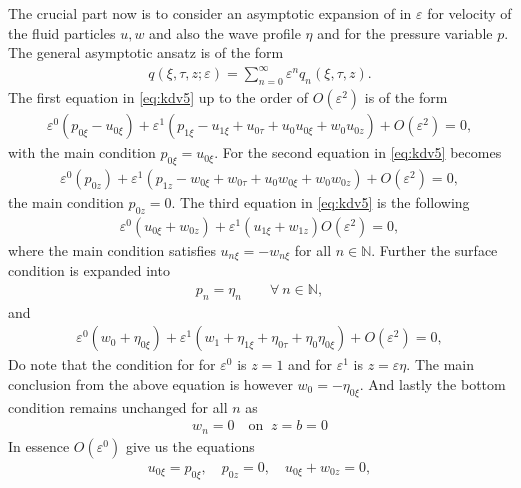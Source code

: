 The crucial part now is to consider an asymptotic expansion of in
$\varepsilon$ for velocity of the fluid particles $u, w$ and also the wave
profile $\eta$ and for the pressure variable $p$. The general asymptotic
ansatz is of the form
\begin{align}
    q\left( \xi, \tau, z; \varepsilon \right)  = \sum_{n=0}^{\infty}
    \varepsilon^n q_n\left( \xi, \tau, z \right).
\end{align}
The first equation in \ref{eq:kdv5} up to the order of $O(\varepsilon^2)$ is
of the form
\begin{align}
    \varepsilon^0\left( p_{0\xi} - u_{0\xi}\right) + \varepsilon^1\left(
    p_{1\xi} - u_{1\xi} + u_{0\tau} + u_0 u_{0\xi} + w_0u_{0z} \right)
    +O(\varepsilon^2) = 0,
\end{align}
with the main condition $p_{0\xi} = u_{0\xi}$. For the second equation in
\ref{eq:kdv5} becomes
\begin{align}
    \varepsilon^0\left( p_{0z} \right)
    +\varepsilon^1\left( p_{1z}-w_{0\xi} + w_{0\tau} + u_0w_{0\xi}+w_0w_{0z} \right)
    + O(\varepsilon^2) = 0,
\end{align}
the main condition $p_{0z} =0 $. The third equation in \ref{eq:kdv5} is the
following
\begin{align}
    \varepsilon^0(u_{0\xi}+w_{0z}) + \varepsilon^1\left( u_{1\xi}+w_{1z}
    \right)
    O(\varepsilon^2) =0,
\end{align}
where the main condition satisfies $u_{n\xi} = -w_{n\xi}$ for all $n \in
\mathbb{N}$. Further the surface condition is expanded into
\begin{align}
    p_n = \eta_n \qquad \forall\ n \in \mathbb{N},
\end{align}
and
\begin{align}
    \varepsilon^0\left(w_0 + \eta_{0\xi}\right)+
    \varepsilon^1\left( w_1 + \eta_{1\xi} + \eta_{0\tau} + \eta_0 \eta_{0\xi}\right)
    + O(\varepsilon^2) = 0,
\end{align}
Do note that the condition for for $\varepsilon^0$ is $z=1$ and for
$\varepsilon^1$ is $z=\varepsilon\eta$. The main conclusion from the above
equation is however $w_0 = -\eta_{0\xi}$. And lastly the bottom condition
remains unchanged for all $n$ as
\begin{align}
    w_n = 0 \quad \text{on}\;\; z= b=0
\end{align}
In essence $O(\varepsilon^0)$ give us the equations
\begin{align}
    u_{0\xi}=p_{0\xi},\quad p_{0z} =0,\quad u_{0\xi} + w_{0z} = 0,
\end{align}
